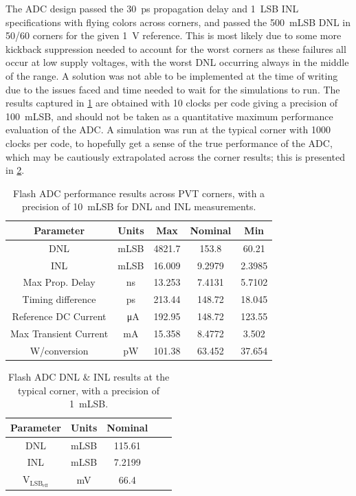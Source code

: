 \documentclass[11pt,letterpaper]{article}
\begin{document}
The ADC design passed the \qty{30}{\ps} propagation delay and \qty{1}{LSB} INL specifications with flying colors across corners, and passed the \qty{500}{mLSB} DNL in 50/60 corners for the given \qty{1}{\V} reference. This is most likely due to some more kickback suppression needed to account for the worst corners as these failures all occur at low supply voltages, with the worst DNL occurring always in the middle of the range. A solution was not able to be implemented at the time of writing due to the issues faced and time needed to wait for the simulations to run. The results captured in \cref{tab:corners_sch} are obtained with 10 clocks per code giving a precision of \qty{100}{mLSB}, and should not be taken as a quantitative maximum performance evaluation of the ADC\@. A simulation was run at the typical corner with 1000 clocks per code, to hopefully get a sense of the true performance of the ADC, which may be cautiously extrapolated across the corner results; this is presented in \cref{tab:typ_sch}.

\begin{table}[]
    \centering
    \begin{tabular}{ccccc}
    \toprule
        Parameter & Units & Max & Nominal & Min \\
    \midrule
        DNL & mLSB & 4821.7 & 153.8 & 60.21 \\
        INL & mLSB & 16.009 & 9.2979 & 2.3985 \\
        Max Prop. Delay & ns & 13.253 & 7.4131 & 5.7102 \\
        Timing difference & ps & 213.44 & 148.72 & 18.045 \\
        Reference DC Current & \qty{}{\uA} & 192.95 & 148.72 & 123.55 \\
        Max Transient Current & mA & 15.358 & 8.4772 & 3.502 \\
        W/conversion & pW & 101.38 & 63.452 & 37.654 \\
    \bottomrule
        
    \end{tabular}
    \caption{Flash ADC performance results across PVT corners, with a precision of \qty{10}{mLSB} for DNL and INL measurements.}\label{tab:corners_sch}
\end{table}

\begin{table}[]
    \centering
    \begin{tabular}{ccccc}
    \toprule
        Parameter & Units & Nominal \\
    \midrule
        DNL & mLSB & 115.61 \\
        INL & mLSB & 7.2199 \\
        \(\mathrm{V_{LSB_{eff}}}\) & mV & 66.4 \\
    \bottomrule
        
    \end{tabular}
    \caption{Flash ADC DNL \& INL results at the typical corner, with a precision of \qty{1}{mLSB}.}\label{tab:typ_sch}
\end{table}
\end{document}
